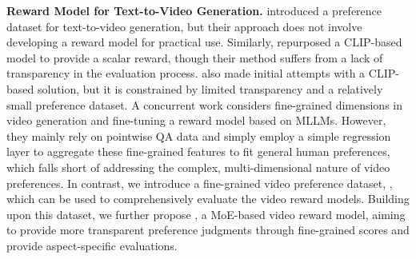 \textbf{Reward Model for Text-to-Video Generation.} \citet{dai2024safesorasafetyalignmenttext2video} introduced a preference dataset for text-to-video generation, but their approach does not involve developing a reward model for practical use. 
Similarly, \citet{yuan2024instructvideo} repurposed a CLIP-based model to provide a scalar reward, though their method suffers from a lack of transparency in the evaluation process. 
\citet{he2024mantisscore} also made initial attempts with a CLIP-based solution, but it is constrained by limited transparency and a relatively small preference dataset.
A concurrent work \citep{xu2024visionreward} considers fine-grained dimensions in video generation and fine-tuning a reward model based on MLLMs. However, they mainly rely on pointwise QA data and simply employ a simple regression layer to aggregate these fine-grained features to fit general human preferences, which falls short of addressing the complex, multi-dimensional nature of video preferences.
%
In contrast, we introduce a fine-grained video preference dataset, \datasetname, which can be used to comprehensively evaluate the video reward models. Building upon this dataset, we further propose \algname, a MoE-based video reward model, aiming to provide more transparent preference judgments through fine-grained scores and provide aspect-specific evaluations. 
